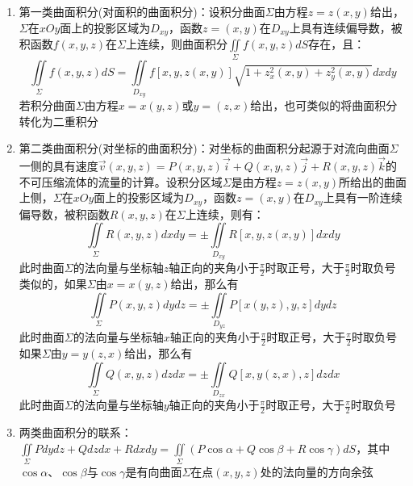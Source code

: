 \documentclass[12pt,a4paper,UTF8]{book}
\begin{document}
\begin{enumerate}
\item 第一类曲面积分(对面积的曲面积分)：设积分曲面$\Sigma$由方程$z=z\left(x,y\right)$给出，$\Sigma$在$xOy$面上的投影区域为$D_{xy}$，函数$z=\left(x,y\right)$在$D_{xy}$上具有连续偏导数，被积函数$f\left(x,y,z\right)$在$\Sigma$上连续，则曲面积分$\iint\limits_{\Sigma}f\left(x,y,z\right)dS$存在，且：
\[\iint\limits_{\Sigma}f\left(x,y,z\right)dS=\iint\limits_{D_{xy}}f\left[x,y,z\left(x,y\right)\right]\sqrt{1+z_x^2\left(x,y\right)+z_y^2\left(x,y\right)}dxdy\]
若积分曲面$\Sigma$由方程$x=x\left(y,z\right)$或$y=\left(z,x\right)$给出，也可类似的将曲面积分转化为二重积分
\item 第二类曲面积分(对坐标的曲面积分)：对坐标的曲面积分起源于对流向曲面$\Sigma$一侧的具有速度$\vec{v}\left(x,y,z\right)=P\left(x,y,z\right)\vec{i}+Q\left(x,y,z\right)\vec{j}+R\left(x,y,z\right)\vec{k}$的不可压缩流体的流量的计算。设积分区域$\Sigma$是由方程$z=z\left(x,y\right)$所给出的曲面上侧，$\Sigma$在$xOy$面上的投影区域为$D_{xy}$，函数$z=\left(x,y\right)$在$D_{xy}$上具有一阶连续偏导数，被积函数$R\left(x,y,z\right)$在$\Sigma$上连续，则有：
\[\iint\limits_{\Sigma}R\left(x,y,z\right)dxdy=\pm\iint\limits_{D_{xy}}R\left[x,y,z\left(x,y\right)\right]dxdy\]
此时曲面$\Sigma$的法向量与坐标轴$z$轴正向的夹角小于$\frac{\pi}{2}$时取正号，大于$\frac{\pi}{2}$时取负号\\
类似的，如果$\Sigma$由$x=x\left(y,z\right)$给出，那么有
\[\iint\limits_{\Sigma}P\left(x,y,z\right)dydz=\pm\iint\limits_{D_{yz}}P\left[x\left(y,z\right),y,z\right]dydz\]
此时曲面$\Sigma$的法向量与坐标轴$x$轴正向的夹角小于$\frac{\pi}{2}$时取正号，大于$\frac{\pi}{2}$时取负号\\
如果$\Sigma$由$y=y\left(z,x\right)$给出，那么有
\[\iint\limits_{\Sigma}Q\left(x,y,z\right)dzdx=\pm\iint\limits_{D_{zx}}Q\left[x,y\left(z,x\right),z\right]dzdx\]
此时曲面$\Sigma$的法向量与坐标轴$y$轴正向的夹角小于$\frac{\pi}{2}$时取正号，大于$\frac{\pi}{2}$时取负号
\item 两类曲面积分的联系：$\iint\limits_{\Sigma}Pdydz+Qdzdx+Rdxdy=\iint\limits_{\Sigma}\left(P\cos\alpha+Q\cos\beta+R\cos\gamma\right)dS$，其中$\cos\alpha$、$\cos\beta$与$\cos\gamma$是有向曲面$\Sigma$在点$\left(x,y,z\right)$处的法向量的方向余弦
\end{enumerate}
\end{document}
